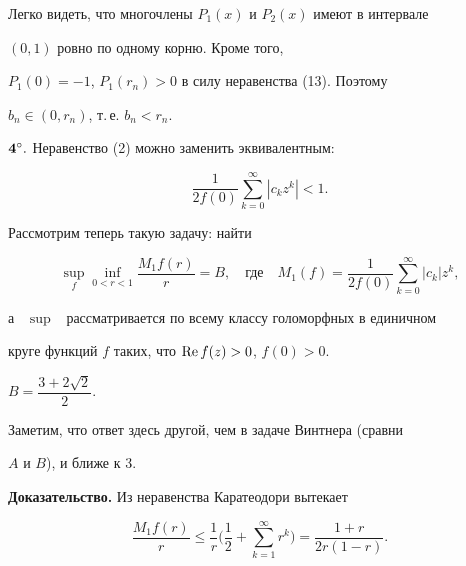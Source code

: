 Легко видеть, что многочлены $P_1(x)$ и $P_2(x)$ имеют в интервале


$(0,1)$ ровно по одному корню. Кроме того,


$P_1(0)=-1$, $P_1(r_n)>0$ в силу неравенства (13). Поэтому


$b_n\in(0,r_n)$, т.\,е. $b_n<r_n$.


\medskip





${\bold 4^\circ.}$ Неравенство (2) можно заменить эквивалентным:


$$


\frac{1}{2f(0)}\sum\limits_{k=0}^{\infty}|c_kz^k|<1.


$$





Рассмотрим теперь  такую  задачу: найти


$$


\sup\limits_{f}


\inf\limits_{0<r<1}\displaystyle{\frac{M_1f(r)}{r}}=B,\quad \text{где}\quad


M_1(f)=\frac{1}{2f(0)}\sum\limits_{k=0}^{\infty}|c_k|z^k,


$$


а \ $\sup$ \ рассматривается по всему классу голоморфных в единичном


круге функций $f$ таких, что $\operatorname{Re} f(z)>0$, $f(0)>0$.





\begin{thm}


$B=\dfrac{3+2\sqrt{2}}{2}$.


\end{thm}





Заметим, что ответ здесь другой, чем в задаче Винтнера (сравни


$A$ и $B$), и ближе к 3.





{\bf Доказательство.} Из неравенства Каратеодори вытекает


\begin{equation}


\frac{M_1f(r)}{r}\leq\frac{1}{r}\bigg(\frac{1}{2}+\sum_{k=1}^{\infty}


r^k\bigg)=\frac{1+r}{2r(1-r)}.


\end{equation}


